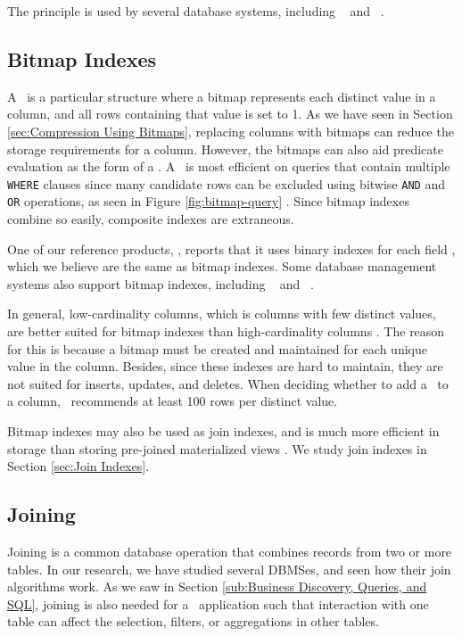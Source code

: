 The  principle is used by several database systems, including \ibm~\cite{Raman2013-em} and \monetdb~\cite{Boncz2002-yj}. 

\subsection{Bitmap Indexes}
\label{sub:Bitmap Indexes}


A \biti~is a particular structure where a bitmap represents each distinct value in a column, and all rows containing that value is set to 1. As we have seen in Section \ref{sec:Compression Using Bitmaps}, replacing columns with bitmaps can reduce the storage requirements for a column. However, the bitmaps can also aid predicate evaluation as the form of a \biti. A \biti~is most efficient on queries that contain multiple \texttt{WHERE} clauses since many candidate rows can be excluded using bitwise \texttt{AND} and \texttt{OR} operations, as seen in Figure \ref{fig:bitmap-query} \cite{noauthor_undated-hp}. Since bitmap indexes combine so easily, composite indexes are extraneous. 

One of our reference products, \qlikview, reports that it uses binary indexes for each field \cite{Qlik2011-ef}, which we believe are the same as bitmap indexes. Some database management systems also support bitmap indexes, including \oracle~\cite{noauthor_undated-hp} and \ibm~\cite{Raman2013-em}.

In general, low-cardinality columns, which is columns with few distinct values, are better suited for bitmap indexes than high-cardinality columns \cite{noauthor_undated-hp}. The reason for this is because a bitmap must be created and maintained for each unique value in the column. Besides, since these indexes are hard to maintain, they are not suited for inserts, updates, and deletes. When deciding whether to add a \biti~to a column, \oracle~recommends at least 100 rows per distinct value. 

Bitmap indexes may also be used as join indexes, and is much more efficient in storage than storing pre-joined materialized views \cite{noauthor_undated-hp}. We study join indexes in Section \ref{sec:Join Indexes}.

\subsection{Joining}
\label{sub:Joining}
Joining is a common database operation that combines records from two or more tables. In our research, we have studied several DBMSes, and seen how their join algorithms work. As we saw in Section \ref{sub:Business Discovery, Queries, and SQL}, joining is also needed for a \bd~application such that interaction with one table can affect the selection, filters, or aggregations in other tables.


